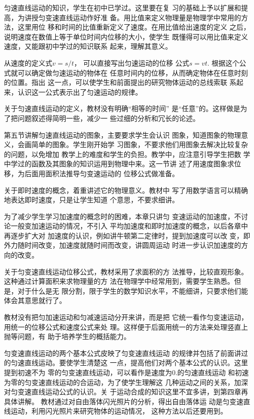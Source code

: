 匀速直线运动的知识，学生在初中已学过。这里要在复
习的基础上予以扩展和提高，为讲授匀变速直线运动作好准
备。用比值来定义物理量是物理学中常用的方法，这里用位
移和时间的比值重新定义了速度。在用比值给出速度的定义
之后，说明速度在数值上等于单位时间内位移的大小，使学生
既懂得可以用比值来定义速度，又能跟初中学过的知识联系
起来，理解其意义。

从速度的定义式$v=s/t$，
可以直接写出匀速运动的位移
公式$s=vt$. 根据这个公式就可以确定做匀速运动的物体在
任意时间内的位移，从而确定物体在任意时刻的位置。指出
这一点，可以使学生和前面提出的研究物体运动的总线索联
系起来，认识这一公式表示出了匀速运动的规律。

关于匀速直线运动的定义，教材没有明确“相等的时间”
是“任意”的。这样做是为了把问题叙述得简明一些，减少一
些过细的分析和冗长的论述。

第五节讲解匀速直线运动的图象，主要要求学生会认识
图象，知道图象的物理意义，会画简单的图象。学生刚开始学
习图象，不要求他们用图象去解决比较复杂的问题，以免增加
教学上的难度和学生的负担。教学中，应注意引导学生把数
学中学过的函数及其图象的知识运用到物理中来。这一节讲
述了用速度图象求位移，为后面用面积法推导匀变速运动的
位移公式做准备。

关于即时速度的概念，着重讲述它的物理意义。教材中
写了用数学语言可以精确地表达即时速度，只是让学生知道
个意思，不要求细讲。

为了减少学生学习加速度的概念时的困难，本章只讲匀
变速运动的加速度，不讨论一般变加速运动的情况，不引入
平均加速度和即时加速度的概念，以后各章中再逐步扩大对
加速度的认识，例如讲牛顿第二定律时，提到加速度可以改
变，即外力随时间改变，加速度就随时间而改变，讲圆周运动
时进一步认识加速度的方向的改变。

关于匀变速直线运动位移公式，教材采用了求面积的方
法推导，比较直观形象。这种通过计算面积来求物理量的方
法在物理学中经常用到，需要学生熟悉。但是，对于什么是无
限分割，限于学生的数学知识水平，不能细讲，只要求他们能
体会其意思就行了。

教材没有把匀加速运动和匀减速运动分开来讲，而是把
它统一看作匀变速运动，用统一的位移公式和速度公式来处
理。这样便于后面用统一的方法来处理竖直上抛等问题，有
助于培养学生的概括能力。

匀变速直线运动的两个基本公式皮映了匀变速直线运动
的规律并包括了前面讲过的匀速直线运动。要使学生清楚这
一点，提高他们对两个基本公式的认识。这里提到初速不为
零的匀变速直线运动，可以看作是速度为0.的匀速直线运动
和初速为零的匀变速直线运动的合运动，为了使学生理解这
几种运动之间的关系，加深对匀变速直线运动公式的认识。关
于运动合成的知识这里不宜多讲，到第四章再具体讲解。
教材通过对自由落体闪光照片的分析，得出自由落体运
动是匀变速直线运动，利用闪光照片来研究物体的运动情况，
这种方法以后还要用到。

